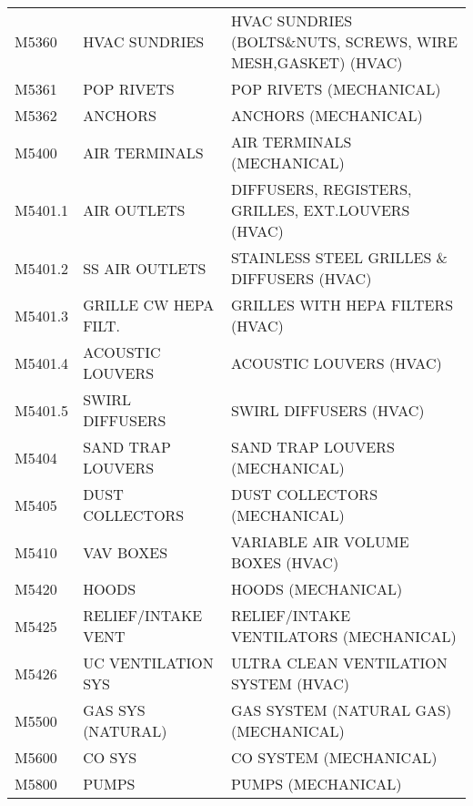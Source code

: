 \begin{longtable}[l]{l%
                  l|%
                  l|}
\rowcolor{thetableheadbgcolor!0.25!white} M5360       & HVAC SUNDRIES   & HVAC SUNDRIES (BOLTS\&NUTS, SCREWS, WIRE MESH,GASKET) (HVAC)   \\
\rowcolor{thetableheadbgcolor!0.25!white} M5361       & POP RIVETS   & POP RIVETS (MECHANICAL)   \\
\rowcolor{thetableheadbgcolor!0.25!white} M5362       & ANCHORS   & ANCHORS (MECHANICAL)   \\
\rowcolor{thetableheadbgcolor!0.25!white} M5400       & AIR TERMINALS   & AIR TERMINALS (MECHANICAL)   \\
\rowcolor{thetableheadbgcolor!0.25!white} M5401.1     & AIR OUTLETS   & DIFFUSERS, REGISTERS, GRILLES, EXT.LOUVERS (HVAC)   \\
\rowcolor{thetableheadbgcolor!0.25!white} M5401.2     & SS AIR OUTLETS   & STAINLESS STEEL GRILLES \& DIFFUSERS (HVAC)   \\
\rowcolor{thetableheadbgcolor!0.25!white} M5401.3     & GRILLE CW HEPA FILT.   & GRILLES WITH HEPA FILTERS (HVAC)   \\
\rowcolor{thetableheadbgcolor!0.25!white} M5401.4     & ACOUSTIC LOUVERS   & ACOUSTIC LOUVERS (HVAC)   \\
\rowcolor{thetableheadbgcolor!0.25!white} M5401.5     & SWIRL DIFFUSERS   & SWIRL DIFFUSERS (HVAC)   \\
\rowcolor{thetableheadbgcolor!0.25!white} M5404       & SAND TRAP LOUVERS   & SAND TRAP LOUVERS (MECHANICAL)   \\
\rowcolor{thetableheadbgcolor!0.25!white} M5405       & DUST COLLECTORS   & DUST COLLECTORS (MECHANICAL)   \\
\rowcolor{thetableheadbgcolor!0.25!white} M5410       & VAV BOXES   & VARIABLE AIR VOLUME BOXES (HVAC)   \\
\rowcolor{thetableheadbgcolor!0.25!white} M5420       & HOODS   & HOODS (MECHANICAL)   \\
\rowcolor{thetableheadbgcolor!0.25!white} M5425       & RELIEF/INTAKE VENT   & RELIEF/INTAKE VENTILATORS (MECHANICAL)   \\
\rowcolor{thetableheadbgcolor!0.25!white} M5426       & UC VENTILATION SYS   & ULTRA CLEAN VENTILATION SYSTEM (HVAC)   \\
\rowcolor{thetableheadbgcolor!0.25!white} M5500       & GAS SYS (NATURAL)   & GAS SYSTEM (NATURAL GAS) (MECHANICAL)   \\
\rowcolor{thetableheadbgcolor!0.25!white} M5600       & CO SYS   & CO SYSTEM (MECHANICAL)   \\
\rowcolor{thetableheadbgcolor!0.25!white} M5800       & PUMPS   & PUMPS (MECHANICAL)   \\

\end{longtable}
